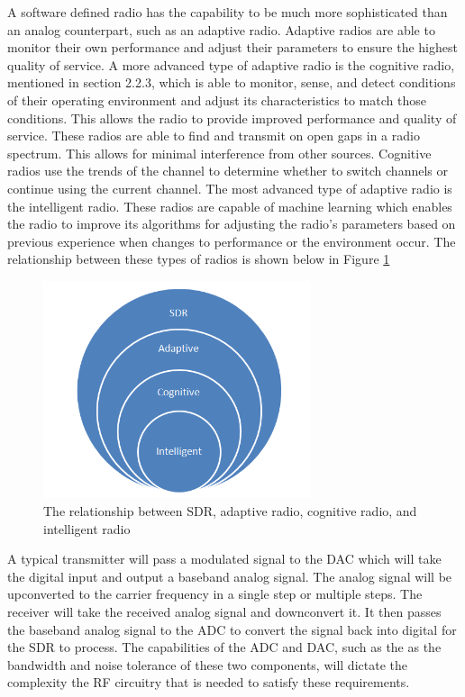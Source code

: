 A software defined radio has the capability to be much more sophisticated than an analog counterpart, such as an adaptive radio. Adaptive radios are able to monitor their own performance and adjust their parameters to ensure the highest quality of service.\cite{cog_radios} A more advanced type of adaptive radio is the cognitive radio, mentioned in section 2.2.3, which is able to monitor, sense, and detect conditions of their operating environment and adjust its characteristics to match those conditions. This allows the radio to provide improved performance and quality of service. These radios are able to find and transmit on open gaps in a radio spectrum. This allows for minimal interference from other sources. Cognitive radios use the trends of the channel to determine whether to switch channels or continue using the current channel. The most advanced type of adaptive radio is the intelligent radio. These radios are capable of machine learning which enables the radio to improve its algorithms for adjusting the radio's parameters based on previous experience when changes to performance or the environment occur.\cite{int_radio} The relationship between these types of radios is shown below in Figure \ref{fig:sdr_relationship_diagram}
\begin{figure}[ht]
\centering
\includegraphics[width=0.70\textwidth]{img/sdr_diagram2.png}
\caption{The relationship between SDR, adaptive radio, cognitive radio, and intelligent radio}
\label{fig:sdr_relationship_diagram}
\end{figure}\par
A typical transmitter will pass a modulated signal to the DAC which will take the digital input and output a baseband analog signal. The analog signal will be upconverted to the carrier frequency in a single step or multiple steps. The receiver will take the received analog signal and downconvert it. It then passes the baseband analog signal to the ADC to convert the signal back into digital for the SDR to process. The capabilities of the ADC and DAC, such as the as the bandwidth and noise tolerance of these two components, will dictate the complexity the RF circuitry that is needed to satisfy these requirements.\par
